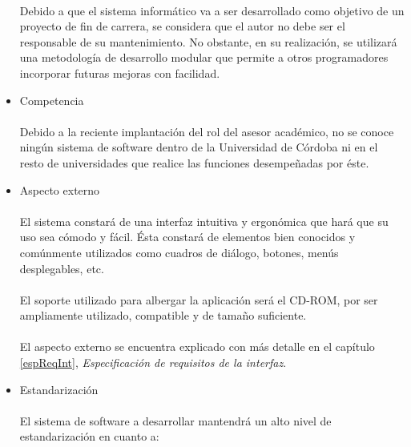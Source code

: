 \begin{itemize}
   \paragraph{}Debido a que el sistema informático va a ser desarrollado como
   objetivo de un proyecto de fin de carrera, se considera que el autor no debe
   ser el responsable de su mantenimiento. No obstante, en su realización, se
   utilizará una metodología de desarrollo modular que permite a otros
   programadores incorporar futuras mejoras con facilidad.

 \item Competencia

   \paragraph{}Debido a la reciente implantación del rol del asesor académico,
   no se conoce ningún sistema de software dentro de la Universidad de Córdoba
   ni en el resto de universidades que realice las funciones desempeñadas por
   éste.

 \item Aspecto externo

   \paragraph{}El sistema constará de una interfaz intuitiva y ergonómica que
   hará que su uso sea cómodo y fácil. Ésta constará de elementos bien conocidos
   y comúnmente utilizados como cuadros de diálogo, botones, menús desplegables,
   etc.

   \paragraph{}El soporte utilizado para albergar la aplicación será el CD-ROM,
   por ser ampliamente utilizado, compatible y de tamaño suficiente.

   \paragraph{}El aspecto externo se encuentra explicado con más detalle en el
   capítulo \ref{espReqInt}, \textit{Especificación de requisitos de la
   interfaz}.

 \item Estandarización

   \paragraph{}El sistema de software a desarrollar mantendrá un alto nivel de
   estandarización en cuanto a:


\end{itemize}
